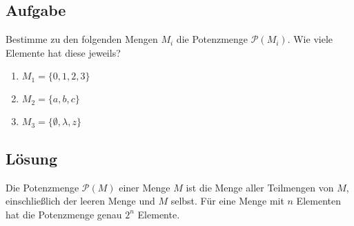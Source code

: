 \documentclass{article}
\begin{document}
\subsection*{Aufgabe}
Bestimme zu den folgenden Mengen $M_{i}$ die Potenzmenge
$\mathcal{P}(M_{i})$. Wie viele Elemente hat diese jeweils?
\begin{enumerate}
\item $M_{1} = \{0, 1, 2, 3\}$
\item $M_{2} = \{a, b, c\}$
\item $M_{3} = \{\emptyset, \lambda, z\}$
\end{enumerate}

\subsection*{Lösung}
Die Potenzmenge $\mathcal{P}(M)$ einer Menge $M$ ist die Menge aller Teilmengen von $M$, einschließlich der leeren Menge und $M$ selbst. Für eine Menge mit $n$ Elementen hat die Potenzmenge genau $2^n$ Elemente.
\end{document}
